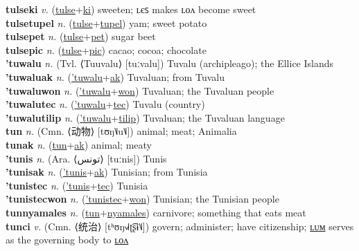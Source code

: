\textbf{tulseki} \textit{v.} (\hyperref[tulse]{tulse}+\hyperref[ki]{ki})
sweeten; ʟєꜱ makes ʟᴏᴧ become sweet \label{tulseki} \\
\textbf{tulsetupel} \textit{n.} (\hyperref[tulse]{tulse}+\hyperref[tupel]{tupel})
yam; sweet potato \label{tulsetupel} \\
\textbf{tulsepet} \textit{n.} (\hyperref[tulse]{tulse}+\hyperref[pet]{pet})
sugar beet \label{tulsepet} \\
\textbf{tulsepic} \textit{n.} (\hyperref[tulse]{tulse}+\hyperref[pic]{pic})
cacao; cocoa; chocolate \label{tulsepic} \\
\textbf{'tuwalu} \textit{n.} (Tvl. ⟨Tuuvalu⟩ [tuːvalu])
Tuvalu (archipleago); the Ellice Islands \label{'tuwalu} \\
\textbf{'tuwaluak} \textit{n.} (\hyperref['tuwalu]{'tuwalu}+\hyperref[ak]{ak})
Tuvaluan; from Tuvalu \label{'tuwaluak} \\
\textbf{'tuwaluwon} \textit{n.} (\hyperref['tuwalu]{'tuwalu}+\hyperref[won]{won})
Tuvaluan; the Tuvaluan people \label{'tuwaluwon} \\
\textbf{'tuwalutec} \textit{n.} (\hyperref['tuwalu]{'tuwalu}+\hyperref[tec]{tec})
Tuvalu (country) \label{'tuwalutec} \\
\textbf{'tuwalutilip} \textit{n.} (\hyperref['tuwalu]{'tuwalu}+\hyperref[tilip]{tilip})
Tuvaluan; the Tuvaluan language \label{'tuwalutilip} \\
\textbf{tun} \textit{n.} (Cmn. ⟨动物⟩ [tʊŋ˥˩u˥˩])
animal; meat; Animalia \label{tun} \\
\textbf{tunak} \textit{n.} (\hyperref[tun]{tun}+\hyperref[ak]{ak})
animal; meaty \label{tunak} \\
\textbf{'tunis} \textit{n.} (Ara. ⟨تونس⟩ [tuːnis])
Tunis \label{'tunis} \\
\textbf{'tunisak} \textit{n.} (\hyperref['tunis]{'tunis}+\hyperref[ak]{ak})
Tunisian; from Tunisia \label{'tunisak} \\
\textbf{'tunistec} \textit{n.} (\hyperref['tunis]{'tunis}+\hyperref[tec]{tec})
Tunisia \label{'tunistec} \\
\textbf{'tunistecwon} \textit{n.} (\hyperref['tunistec]{'tunistec}+\hyperref[won]{won})
Tunisian; the Tunisian people \label{'tunistecwon} \\
\textbf{tunnyamales} \textit{n.} (\hyperref[tun]{tun}+\hyperref[nyamales]{nyamales})
carnivore; something that eats meat \label{tunnyamales} \\
\textbf{tunci} \textit{v.} (Cmn. ⟨统治⟩ [tʰʊŋ˧˩˧ʈ͡ʂɨ˥˩])
govern; administer; have citizenship; \hyperref[tuncilum]{ʟᴜᴍ} serves as the governing body to \hyperref[tuncilon]{ʟᴏᴧ} \label{tunci} \\
